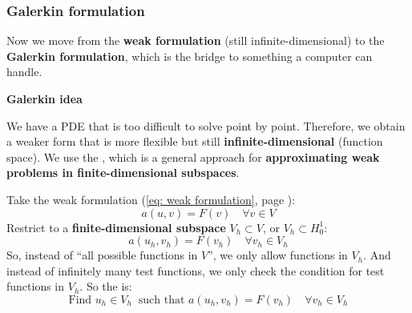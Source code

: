 \subsubsection{Galerkin formulation}\label{subsubsection: Galerkin formulation}

Now we move from the \textbf{weak formulation} (still infinite-dimensional) to the \textbf{Galerkin formulation}, which is the bridge to something a computer can handle.

\highspace
\begin{flushleft}
    \textcolor{Green3}{ \textbf{Galerkin idea}}
\end{flushleft}
We have a PDE that is too difficult to solve point by point. Therefore, we obtain a weaker form that is more flexible but still \textbf{infinite-dimensional} (function space). We use the , which is a general approach for \textbf{approximating weak problems in finite-dimensional subspaces}.

\highspace
Take the weak formulation (\ref{eq: weak formulation}, page \pageref{eq: weak formulation}):
\begin{equation*}
    a(u,v) = F(v) \quad \forall v \in V
\end{equation*}
Restrict to a \textbf{finite-dimensional subspace} $V_h \subset V$, or $V_{h} \subset H_{0}^{1}$:
\begin{equation}
    a(u_h,v_h) = F(v_h) \quad \forall v_h \in V_h
\end{equation}
So, instead of ``all possible functions in $V$'', we only allow functions in $V_h$. And instead of infinitely many test functions, we only check the condition for test functions in $V_h$. So the  is:
\begin{equation}
    \text{Find } u_h \in V_h \;\; \text{such that } a(u_h,v_h) = F(v_h) \quad \forall v_h \in V_h
\end{equation}


